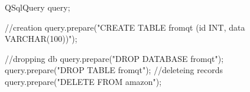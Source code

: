 QSqlQuery query;

//creation
query.prepare("CREATE TABLE fromqt (id INT, data VARCHAR(100))");

//dropping db
query.prepare("DROP DATABASE fromqt");
query.prepare("DROP TABLE fromqt");
//deleteing records
query.prepare("DELETE FROM amazon");

